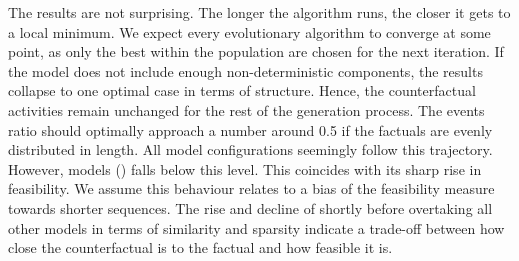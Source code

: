\documentclass[./../../paper.tex]{subfiles}
\begin{document}
The results are not surprising. The longer the algorithm runs, the closer it gets to a local minimum. 
We expect every evolutionary algorithm to converge at some point, as only the best within the population are chosen for the next iteration. If the model does not include enough non-deterministic components, the results collapse to one optimal case in terms of structure. Hence, the counterfactual activities remain unchanged for the rest of the generation process. 
The events ratio should optimally approach a number around 0.5 if the factuals are evenly distributed in length. All model configurations seemingly follow this trajectory. 
However, models () falls below this level. This coincides with its sharp rise in feasibility. We assume this behaviour relates to a bias of the feasibility measure towards shorter sequences.
The rise and decline of  shortly before overtaking all other models in terms of similarity and sparsity indicate a trade-off between how close the counterfactual is to the factual and how feasible it is.     



\end{document}
